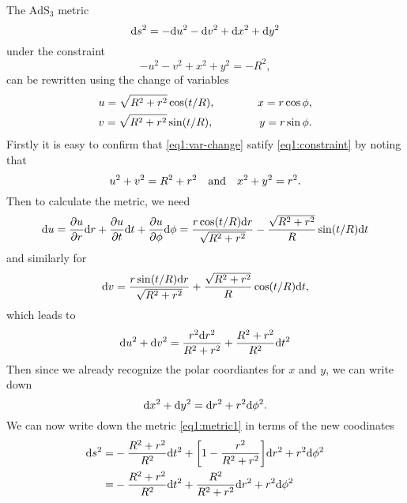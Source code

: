 \documentclass[11pt,a4paper, 
swedish, english %
]{article}
\begin{document}
The $\text{AdS}_3$ metric
\begin{equation}\label{eq1:metric1}
\mathrm{d}{s}^2=-\mathrm{d}{u}^2-\mathrm{d}{v}^2+\mathrm{d}{x}^2+\mathrm{d}{y}^2
\end{equation}
under the constraint
\begin{equation}\label{eq1:constraint}
-u^2-v^2+x^2+y^2=-R^2,
\end{equation}
can be rewritten using the change of variables
\begin{equation}\label{eq1:var-change}
\begin{aligned}
&u=\sqrt{R^2+r^2}\cos(t/R)
\qc\qquad &x=r\cos\phi, \\
&v=\sqrt{R^2+r^2}\sin(t/R)
\qc\qquad &y=r\sin\phi.
\end{aligned}
\end{equation}
Firstly it is easy to confirm that \eqref{eq1:var-change} satify
\eqref{eq1:constraint} by noting that
\begin{equation}
u^2+v^2=R^2+r^2\qand
x^2+y^2=r^2.
\end{equation}
Then to calculate the metric, we need
\begin{equation}
\mathrm{d}{u}=\pdv{u}{r}\mathrm{d}{r}+\pdv{u}{t}\mathrm{d}{t}+\pdv{u}{\phi}\mathrm{d}\phi
=\frac{r\cos(t/R)\mathrm{d}{r}}{\sqrt{R^2+r^2}}
-\frac{\sqrt{R^2+r^2}}{R}\sin(t/R)\mathrm{d}{t}
\end{equation}
and similarly for
\begin{equation}
\mathrm{d}{v}=\frac{r\sin(t/R)\mathrm{d}{r}}{\sqrt{R^2+r^2}}
+\frac{\sqrt{R^2+r^2}}{R}\cos(t/R)\mathrm{d}{t},
\end{equation}
which leads to
\begin{equation}
\mathrm{d}{u}^2+\mathrm{d}{v}^2=
\frac{r^2\mathrm{d}{r}^2}{R^2+r^2}+\frac{R^2+r^2}{R^2}\mathrm{d}{t}^2
\end{equation}
Then since we already recognize the polar coordiantes for $x$ and $y$,
we can write down
\begin{equation}
\mathrm{d}{x}^2+\mathrm{d}{y}^2=\mathrm{d}{r}^2+r^2\mathrm{d}\phi^2.
\end{equation}
We can now write down the metric \eqref{eq1:metric1} in terms of the
new coodinates
\begin{equation}
\begin{aligned}
\mathrm{d}{s}^2=&-\frac{R^2+r^2}{R^2}\mathrm{d}{t}^2
+\qty[1-\frac{r^2}{R^2+r^2}]\mathrm{d}{r}^2+r^2\mathrm{d}\phi^2\\
=&-\frac{R^2+r^2}{R^2}\mathrm{d}{t}^2
+\frac{R^2}{R^2+r^2}\mathrm{d}{r}^2+r^2\mathrm{d}\phi^2
\end{aligned}
\end{equation}
\end{document}
